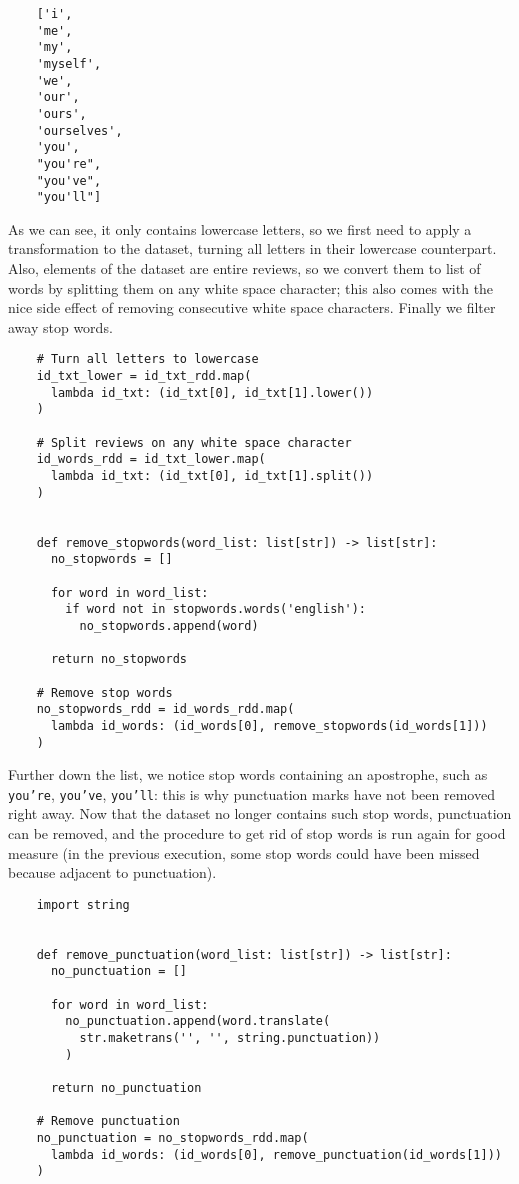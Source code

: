 \documentclass{article}
\begin{document}
  \begin{verbatim}
    ['i',
    'me',
    'my',
    'myself',
    'we',
    'our',
    'ours',
    'ourselves',
    'you',
    "you're",
    "you've",
    "you'll"]
  \end{verbatim}
  As we can see, it only contains lowercase letters, so we first need to apply
  a transformation to the dataset, turning all letters in their lowercase
  counterpart. Also, elements of the dataset are entire reviews, so we convert
  them to list of words by splitting them on any white space character; this
  also comes with the nice side effect of removing consecutive white space
  characters. Finally we filter away stop words. \\
  \begin{verbatim}
    # Turn all letters to lowercase
    id_txt_lower = id_txt_rdd.map(
      lambda id_txt: (id_txt[0], id_txt[1].lower())
    )

    # Split reviews on any white space character
    id_words_rdd = id_txt_lower.map(
      lambda id_txt: (id_txt[0], id_txt[1].split())
    )


    def remove_stopwords(word_list: list[str]) -> list[str]:
      no_stopwords = []

      for word in word_list:
        if word not in stopwords.words('english'):
          no_stopwords.append(word)

      return no_stopwords

    # Remove stop words
    no_stopwords_rdd = id_words_rdd.map(
      lambda id_words: (id_words[0], remove_stopwords(id_words[1]))
    )
  \end{verbatim}
  Further down the list, we notice stop words containing an apostrophe, such as
  \texttt{you're}, \texttt{you've}, \texttt{you'll}: this is why punctuation
  marks have not been removed right away. Now that the dataset no longer
  contains such stop words, punctuation can be removed, and the procedure to
  get rid of stop words is run again for good measure (in the previous
  execution, some stop words could have been missed because adjacent to
  punctuation). \\
  \begin{verbatim}
    import string


    def remove_punctuation(word_list: list[str]) -> list[str]:
      no_punctuation = []

      for word in word_list:
        no_punctuation.append(word.translate(
          str.maketrans('', '', string.punctuation))
        )

      return no_punctuation

    # Remove punctuation
    no_punctuation = no_stopwords_rdd.map(
      lambda id_words: (id_words[0], remove_punctuation(id_words[1]))
    )
  \end{verbatim}
\end{document}
